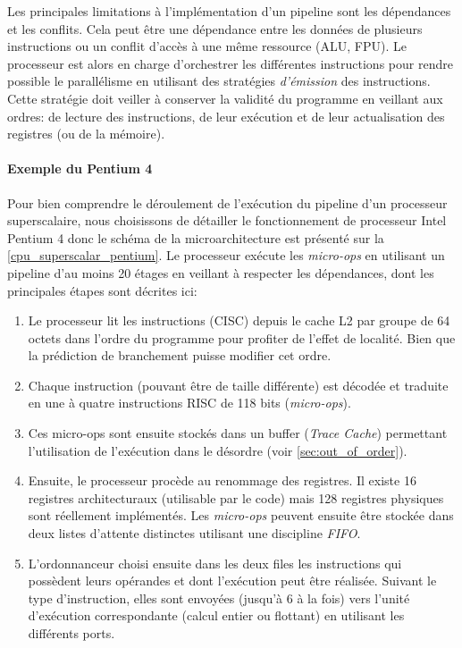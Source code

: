 Les principales limitations à l'implémentation d'un pipeline sont les dépendances et les conflits. Cela peut être une dépendance entre les données de plusieurs instructions ou un conflit d'accès à une même ressource (ALU, FPU). Le processeur est alors en charge d'orchestrer les différentes instructions pour rendre possible le parallélisme en utilisant des stratégies \textit{d’émission} \cite{johnson1989super} des instructions. Cette stratégie doit veiller à conserver la validité du programme en veillant aux ordres: de lecture des instructions, de leur exécution et de leur actualisation des registres (ou de la mémoire). 


\paragraph{Exemple du Pentium 4}
Pour bien comprendre le déroulement de l'exécution du pipeline d'un processeur superscalaire, nous choisissons de détailler le fonctionnement de processeur Intel Pentium 4 \cite{stallings2003organisation} donc le schéma de la microarchitecture est présenté sur la \autoref{cpu_superscalar_pentium}. Le processeur exécute les \textit{micro-ops} en utilisant un pipeline d'au moins 20 étages en veillant à respecter les dépendances, dont les principales étapes sont décrites ici: 

\begin{enumerate}     
\item Le processeur lit les instructions (CISC) depuis le cache L2 par groupe de 64 octets dans l'ordre du programme pour profiter de l'effet de localité. Bien que la prédiction de branchement puisse modifier cet ordre. 
\item Chaque instruction (pouvant être de taille différente) est décodée et traduite en une à quatre instructions RISC de 118 bits (\textit{micro-ops}). 
\item Ces micro-ops sont ensuite stockés dans un buffer (\textit{Trace Cache}) permettant l'utilisation de l'exécution dans le désordre (voir \autoref{sec:out_of_order}).
\item Ensuite, le processeur procède au renommage des registres. Il existe 16 registres architecturaux (utilisable par le code) mais 128 registres physiques sont réellement implémentés. Les \textit{micro-ops} peuvent ensuite être stockée dans deux listes d'attente distinctes utilisant une discipline \textit{FIFO}.
\item L'ordonnanceur choisi ensuite dans les deux files les instructions qui possèdent leurs opérandes et dont l'exécution peut être réalisée. Suivant le type d'instruction, elles sont envoyées (jusqu'à 6 à la fois) vers l'unité d'exécution correspondante (calcul entier ou flottant) en utilisant les différents ports. 
\end{enumerate}
     


